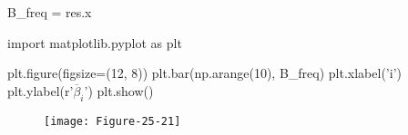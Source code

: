 \begin{python}
B_freq = res.x

import matplotlib.pyplot as plt

plt.figure(figsize=(12, 8))
plt.bar(np.arange(10), B_freq)
plt.xlabel('i')
plt.ylabel(r'$\overline{\beta}_i$')
plt.show()
\end{python}

\begin{figure}[H]
\texttt{[image: Figure-25-21]}
\end{figure}
